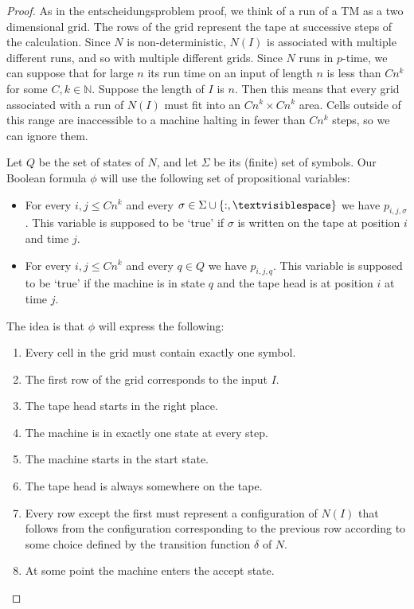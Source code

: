 \documentclass{article}
\theoremstyle{plain}
\theoremstyle{definition}
\newcommand{\tvs}{\textvisiblespace}
\begin{document}
\begin{proof}
As in the entscheidungsproblem proof, we think of a run of a TM as a two dimensional grid. The rows of the grid represent the tape at successive steps of the calculation. Since $N$ is non-deterministic, $N(I)$ is associated with multiple different runs, and so with multiple different grids. Since $N$ runs in $p$-time, we can suppose that for large $n$ its run time on an input of length $n$ is less than $Cn^k$ for some $C,k\in \mathbb{N}$. Suppose the length of $I$ is $n$. Then this means that every grid associated with a run of $N(I)$ must fit into an $Cn^k\times Cn^k$ area. Cells outside of this range are inaccessible to a machine halting in fewer than $Cn^k$ steps, so we can ignore them.

Let $Q$ be the set of states of $N$, and let $\Sigma$ be its (finite) set of symbols. Our Boolean formula $\phi$ will use the following set of propositional variables:  

\begin{itemize}
\item For every $i,j\leq Cn^k$ and every $\sigma\in \Sigma\cup\{:,\tvs\}$ we have $p_{i,j,\sigma}$. This variable is supposed to be `true' if $\sigma$ is written on the tape at position $i$ and time $j$.  
\item For every $i,j\leq Cn^k$ and every $q\in Q$ we have $p_{i,j,q}$. This variable is supposed to be `true' if the machine is in state $q$ and the tape head is at position $i$ at time $j$.
\end{itemize}

The idea is that $\phi$ will express the following:
\begin{enumerate}
\item Every cell in the grid must contain exactly one symbol. 
\item The first row of the grid corresponds to the input $I$.
\item The tape head starts in the right place.
\item The machine is in exactly one state at every step.
\item The machine starts in the start state.
\item The tape head is always somewhere on the tape. 
\item Every row except the first must represent a configuration of $N(I)$ that follows from the configuration corresponding to the previous row according to some choice defined by the transition function $\delta$ of $N$.
\item At some point the machine enters the accept state.
\end{enumerate}


\end{proof}
\end{document}
